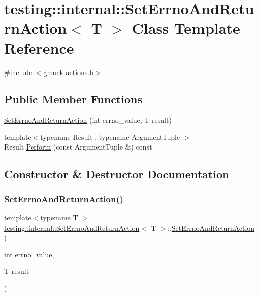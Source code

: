 \hypertarget{classtesting_1_1internal_1_1SetErrnoAndReturnAction}{}\section{testing\+::internal\+::Set\+Errno\+And\+Return\+Action$<$ T $>$ Class Template Reference}
\label{classtesting_1_1internal_1_1SetErrnoAndReturnAction}


{\ttfamily \#include $<$gmock-\/actions.\+h$>$}

\subsection*{Public Member Functions}
\begin{DoxyCompactItemize}
\item 
\mbox{\hyperlink{classtesting_1_1internal_1_1SetErrnoAndReturnAction_abfe5a194a9b8f2b303c635ad99b3a257}{Set\+Errno\+And\+Return\+Action}} (int errno\+\_\+value, T result)
\item 
{\footnotesize template$<$typename Result , typename Argument\+Tuple $>$ }\\Result \mbox{\hyperlink{classtesting_1_1internal_1_1SetErrnoAndReturnAction_a44025d0d124cab72878bf6bdb12c3693}{Perform}} (const Argument\+Tuple \&) const
\end{DoxyCompactItemize}


\subsection{Constructor \& Destructor Documentation}
\mbox{\label{classtesting_1_1internal_1_1SetErrnoAndReturnAction_abfe5a194a9b8f2b303c635ad99b3a257}} 
\subsubsection{\texorpdfstring{SetErrnoAndReturnAction()}{SetErrnoAndReturnAction()}}
{\footnotesize\ttfamily template$<$typename T $>$ \\
\mbox{\hyperlink{classtesting_1_1internal_1_1SetErrnoAndReturnAction}{testing\+::internal\+::\+Set\+Errno\+And\+Return\+Action}}$<$ T $>$\+::\mbox{\hyperlink{classtesting_1_1internal_1_1SetErrnoAndReturnAction}{Set\+Errno\+And\+Return\+Action}} (\begin{DoxyParamCaption}\item[{int}]{errno\+\_\+value,  }\item[{T}]{result }\end{DoxyParamCaption})\hspace{0.3cm}{\ttfamily [inline]}}



